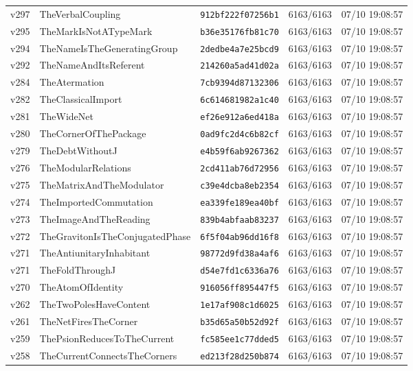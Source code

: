 \documentclass[11pt]{article}
\theoremstyle{definition}\newtheorem{deriv}{Derivação}
\begin{document}
{\begin{longtable}{@{}lllll@{}}
v297 & TheVerbalCoupling & \texttt{912bf222f07256b1} & 6163/6163 & 07/10 19:08:57 \\
v295 & TheMarkIsNotATypeMark & \texttt{b36e35176fb81c70} & 6163/6163 & 07/10 19:08:57 \\
v294 & TheNameIsTheGeneratingGroup & \texttt{2dedbe4a7e25bcd9} & 6163/6163 & 07/10 19:08:57 \\
v292 & TheNameAndItsReferent & \texttt{214260a5ad41d02a} & 6163/6163 & 07/10 19:08:57 \\
v284 & TheAtermation & \texttt{7cb9394d87132306} & 6163/6163 & 07/10 19:08:57 \\
v282 & TheClassicalImport & \texttt{6c614681982a1c40} & 6163/6163 & 07/10 19:08:57 \\
v281 & TheWideNet & \texttt{ef26e912a6ed418a} & 6163/6163 & 07/10 19:08:57 \\
v280 & TheCornerOfThePackage & \texttt{0ad9fc2d4c6b82cf} & 6163/6163 & 07/10 19:08:57 \\
v279 & TheDebtWithoutJ & \texttt{e4b59f6ab9267362} & 6163/6163 & 07/10 19:08:57 \\
v276 & TheModularRelations & \texttt{2cd411ab76d72956} & 6163/6163 & 07/10 19:08:57 \\
v275 & TheMatrixAndTheModulator & \texttt{c39e4dcba8eb2354} & 6163/6163 & 07/10 19:08:57 \\
v274 & TheImportedCommutation & \texttt{ea339fe189ea40bf} & 6163/6163 & 07/10 19:08:57 \\
v273 & TheImageAndTheReading & \texttt{839b4abfaab83237} & 6163/6163 & 07/10 19:08:57 \\
v272 & TheGravitonIsTheConjugatedPhase & \texttt{6f5f04ab96dd16f8} & 6163/6163 & 07/10 19:08:57 \\
v271 & TheAntiunitaryInhabitant & \texttt{98772d9fd38a4af6} & 6163/6163 & 07/10 19:08:57 \\
v271 & TheFoldThroughJ & \texttt{d54e7fd1c6336a76} & 6163/6163 & 07/10 19:08:57 \\
v270 & TheAtomOfIdentity & \texttt{916056ff895447f5} & 6163/6163 & 07/10 19:08:57 \\
v262 & TheTwoPolesHaveContent & \texttt{1e17af908c1d6025} & 6163/6163 & 07/10 19:08:57 \\
v261 & TheNetFiresTheCorner & \texttt{b35d65a50b52d92f} & 6163/6163 & 07/10 19:08:57 \\
v259 & ThePsionReducesToTheCurrent & \texttt{fc585ee1c77dded5} & 6163/6163 & 07/10 19:08:57 \\
v258 & TheCurrentConnectsTheCorners & \texttt{ed213f28d250b874} & 6163/6163 & 07/10 19:08:57 \\

\end{longtable}}
\end{document}
